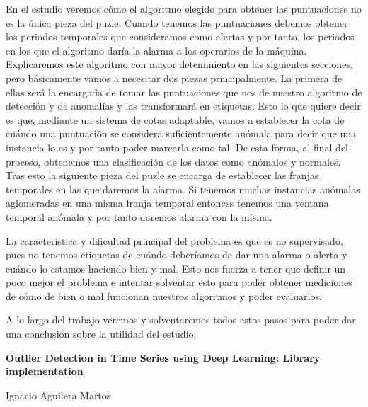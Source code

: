 En el estudio veremos cómo el algoritmo elegido para obtener las puntuaciones no es la única pieza del puzle. Cuando tenemos las puntuaciones debemos obtener los periodos temporales que consideramos como alertas y por tanto, los periodos en los que el algoritmo daría la alarma a los operarios de la máquina. Explicaremos este algoritmo con mayor detenimiento en las siguientes secciones, pero básicamente vamos a necesitar dos piezas principalmente. La primera de ellas será la encargada de tomar las puntuaciones que nos de nuestro algoritmo de detección y de anomalías y las transformará en etiquetas. Esto lo que quiere decir es que, mediante un sistema de cotas adaptable, vamos a establecer la cota de cuándo una puntuación se considera suficientemente anómala para decir que una instancia lo es y por tanto poder marcarla como tal. De esta forma, al final del proceso, obtenemos una clasificación de los datos como anómalos y normales. Tras esto la siguiente pieza del puzle se encarga de establecer las franjas temporales en las que daremos la alarma. Si tenemos muchas instancias anómalas aglomeradas en una misma franja temporal entonces tenemos una ventana temporal anómala y por tanto daremos alarma con la misma.

La característica y dificultad principal del problema es que es no supervisado, pues no tenemos etiquetas de cuándo deberíamos de dar una alarma o alerta y cuándo lo estamos haciendo bien y mal. Esto nos fuerza a tener que definir un poco mejor el problema e intentar solventar esto para poder obtener mediciones de cómo de bien o mal funcionan nuestros algoritmos y poder evaluarlos.

A lo largo del trabajo veremos y solventaremos todos estos pasos para poder dar una conclusión sobre la utilidad del estudio.

\cleardoublepage


\thispagestyle{empty}


\begin{center}
{\large\bfseries Outlier Detection in Time Series using Deep Learning: Library implementation}\\
\end{center}
\begin{center}
Ignacio Aguilera Martos\\
\end{center}

\\

